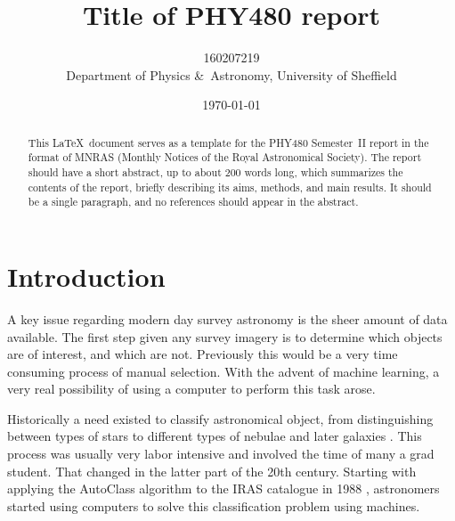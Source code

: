 \documentclass[a4paper,fleqn,usenatbib]{mnras}
\title[PHY480 Project]{Title of PHY480 report}
\author[160207219]{160207219
\\
Department of Physics \&\ Astronomy, University of Sheffield}
\date{\today}
\begin{document}
\label{firstpage}
\pagerange{\pageref{firstpage}--\pageref{lastpage}}
\maketitle

\begin{abstract}
This  \LaTeX\ document serves as a template for the PHY480 Semester~II report in the format of MNRAS (Monthly Notices of the Royal Astronomical Society). The report should have a short abstract, up to about 200 words long, which summarizes the contents of the report, briefly describing its aims, methods, and main results.
It should be a single paragraph, and no references should appear in the abstract.
\end{abstract}







\section{Introduction}
\label{sec:introduction}

A key issue regarding modern day survey astronomy is the sheer amount of data available. The first step given any survey imagery is to determine which objects are of interest, and which are not. Previously this would be a very time consuming process of manual selection. With the advent of machine learning, a very real possibility of using a computer to perform this task arose. 

Historically a need existed to classify astronomical object, from distinguishing between types of stars \cite{HarvardClassification} to different types of nebulae \cite{Nebulae} and later galaxies \cite{Hubble}. This process was usually very labor intensive and involved the time of many a grad student. That changed in the latter part of the 20th century. Starting with applying the AutoClass algorithm to the IRAS catalogue in 1988 \cite{adorf_1988_supervised}, astronomers started using computers to solve this classification problem using machines.
\end{document}
